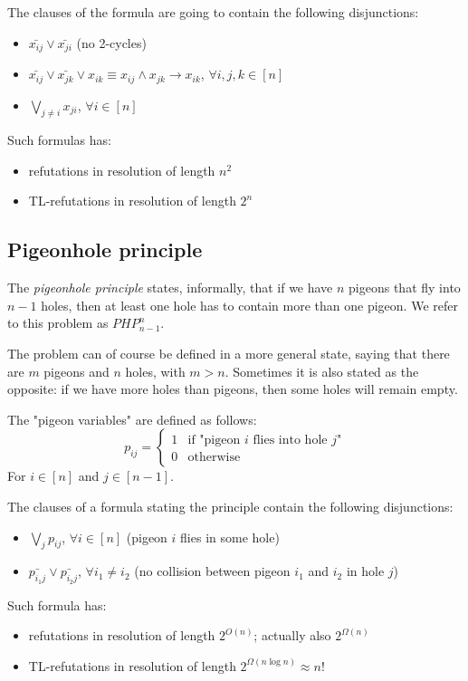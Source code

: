     The clauses of the formula are going to contain the following disjunctions:
    \begin{itemize}
        \item $\bar{x_{ij}} \vee \bar{x_{ji}}$ (no 2-cycles)
        \item $\bar{x_{ij}} \vee \bar{x_{jk}} \vee x_{ik} \equiv x_{ij} \wedge x_{jk} \rightarrow x_{ik}$, $\forall i,j,k \in [n]$
        \item $\bigvee_{j \neq i} x_{ji}$, $\forall i \in [n]$
    \end{itemize}

    Such formulas has:
    \begin{itemize}
        \item refutations in resolution of length $n^2$
        \item TL-refutations in resolution of length $2^n$
    \end{itemize}


\subsection{Pigeonhole principle}\label{subsec:pigeon_principle}
    \def\php{PHP_{n-1}^n}

    The \textit{pigeonhole principle} states, informally, that if we have $n$ pigeons that fly into $n-1$ holes, then at least one hole has to contain more than one pigeon.
    We refer to this problem as $\php$.

    The problem can of course be defined in a more general state, saying that there are $m$ pigeons and $n$ holes, with $m > n$.
    Sometimes it is also stated as the opposite: if we have more holes than pigeons, then some holes will remain empty.

    The "pigeon variables" are defined as follows:
    \begin{equation}\label{eq:pigeon_vars}
        p_{ij} = 
        \begin{cases}
            1 & \text{if "pigeon } i \text{ flies into hole } j \text{"}\\
            0 & \text{otherwise}
        \end{cases}
    \end{equation}
    For $i \in [n]$ and $j \in [n-1]$.

    The clauses of a formula stating the principle contain the following disjunctions:
    \begin{itemize}
        \item $\bigvee_j p_{ij}$, $\forall i \in [n]$ (pigeon $i$ flies in some hole)
        \item $\bar{p_{i_1 j}} \vee \bar{p_{i_2 j}}$, $\forall i_1 \neq i_2$ (no collision between pigeon $i_1$ and $i_2$ in hole $j$)
    \end{itemize}

    Such formula has:
    \begin{itemize}
        \item refutations in resolution of length $2^{O(n)}$; actually also $2^{\Omega(n)}$
        \item TL-refutations in resolution of length $2^{\Omega(n \log n)} \approx n!$
    \end{itemize}